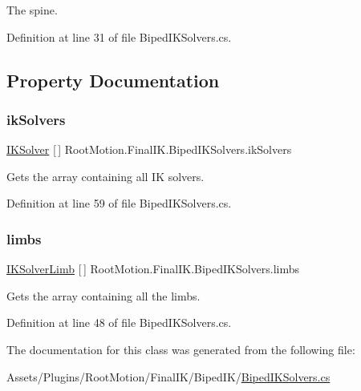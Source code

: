 The spine. 



Definition at line 31 of file Biped\+I\+K\+Solvers.\+cs.



\subsection{Property Documentation}
\mbox{\label{class_root_motion_1_1_final_i_k_1_1_biped_i_k_solvers_a7bdb40fe87d56718f82b393af436c57d}} 
\subsubsection{\texorpdfstring{ik\+Solvers}{ikSolvers}}
{\footnotesize\ttfamily \mbox{\hyperlink{class_root_motion_1_1_final_i_k_1_1_i_k_solver}{I\+K\+Solver}} \mbox{[}$\,$\mbox{]} Root\+Motion.\+Final\+I\+K.\+Biped\+I\+K\+Solvers.\+ik\+Solvers\hspace{0.3cm}{\ttfamily [get]}}



Gets the array containing all IK solvers. 



Definition at line 59 of file Biped\+I\+K\+Solvers.\+cs.

\mbox{\label{class_root_motion_1_1_final_i_k_1_1_biped_i_k_solvers_a3e09348fdc53638bb89bcdd04b2d8b3e}} 
\subsubsection{\texorpdfstring{limbs}{limbs}}
{\footnotesize\ttfamily \mbox{\hyperlink{class_root_motion_1_1_final_i_k_1_1_i_k_solver_limb}{I\+K\+Solver\+Limb}} \mbox{[}$\,$\mbox{]} Root\+Motion.\+Final\+I\+K.\+Biped\+I\+K\+Solvers.\+limbs\hspace{0.3cm}{\ttfamily [get]}}



Gets the array containing all the limbs. 



Definition at line 48 of file Biped\+I\+K\+Solvers.\+cs.



The documentation for this class was generated from the following file\+:\begin{DoxyCompactItemize}
\item 
Assets/\+Plugins/\+Root\+Motion/\+Final\+I\+K/\+Biped\+I\+K/\mbox{\hyperlink{_biped_i_k_solvers_8cs}{Biped\+I\+K\+Solvers.\+cs}}\end{DoxyCompactItemize}
